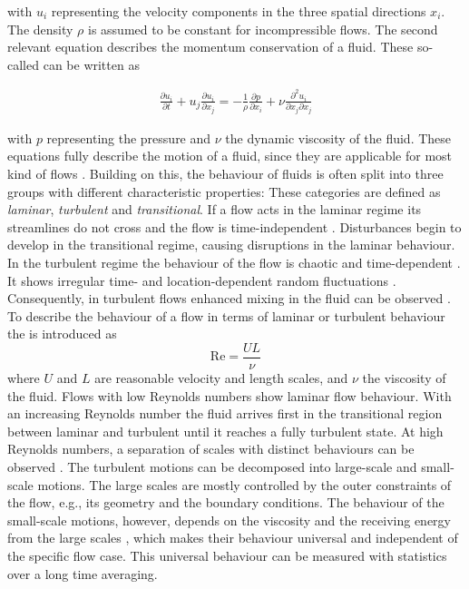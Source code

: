 with $u_i$ representing the velocity components in the three spatial directions $x_i$.
The density $\rho$ is assumed to be constant for incompressible flows.
The second relevant equation describes the momentum conservation of a fluid.
These so-called  can be written as 

\begin{gather}
    \frac{\partial u_i}{\partial t} + u_j \frac{\partial u_i}{\partial x_j} = -\frac{1}{\rho} \frac{\partial p}{\partial x_i} + \nu \frac{\partial^2 u_i}{\partial x_j \partial x_j} 
\end{gather}

with $p$ representing the pressure and $\nu$ the dynamic viscosity of the fluid.
These equations fully describe the motion of a fluid, since they are applicable for most kind of flows \citep{batchelor_introduction_2000}.
Building on this, the behaviour of fluids is often split into three groups with different characteristic properties:
These categories are defined as \emph{laminar}, \emph{turbulent} and \emph{transitional}. 
If a flow acts in the laminar regime its streamlines do not cross and the flow is time-independent \citep{davidson_turbulence_2015}.
Disturbances begin to develop in the transitional regime, causing disruptions in the laminar behaviour.
In the turbulent regime the behaviour of the flow is chaotic and time-dependent \citep{schlichting_boundary-layer_2017}.
It shows irregular time- and location-dependent random fluctuations \citep{pope_turbulent_2015}.
Consequently, in turbulent flows enhanced mixing in the fluid can be observed \citep{pope_turbulent_2015}.
To describe the behaviour of a flow in terms of laminar or turbulent behaviour the  is introduced as 
\begin{equation}
    \mathrm{Re} = \frac{U L}{\nu}
\end{equation}
where $U$ and $L$ are reasonable velocity and length scales, and $\nu$ the viscosity of the fluid.
Flows with low Reynolds numbers show laminar flow behaviour.
With an increasing Reynolds number the fluid arrives first in the transitional region between laminar and turbulent until it reaches a fully turbulent state.
At high Reynolds numbers, a separation of scales with distinct behaviours can be observed \citep{pope_turbulent_2015}.
The turbulent motions can be decomposed into large-scale and small-scale motions.
The large scales are mostly controlled by the outer constraints of the flow, e.g., its geometry and the boundary conditions.
The behaviour of the small-scale motions, however, depends on the viscosity and the receiving energy from the large scales \citep{pope_turbulent_2015}, which makes their behaviour universal and independent of the specific flow case.
This universal behaviour can be measured with statistics over a long time averaging.

